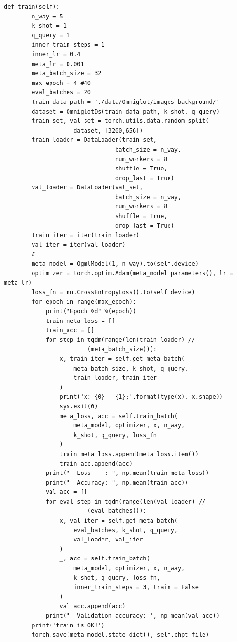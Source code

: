 \begin{lstlisting}
def train(self):
        n_way = 5
        k_shot = 1
        q_query = 1
        inner_train_steps = 1
        inner_lr = 0.4
        meta_lr = 0.001
        meta_batch_size = 32
        max_epoch = 4 #40
        eval_batches = 20
        train_data_path = './data/Omniglot/images_background/'
        dataset = OmniglotDs(train_data_path, k_shot, q_query)
        train_set, val_set = torch.utils.data.random_split(
                    dataset, [3200,656])
        train_loader = DataLoader(train_set,
                                batch_size = n_way,
                                num_workers = 8,
                                shuffle = True,
                                drop_last = True)
        val_loader = DataLoader(val_set,
                                batch_size = n_way,
                                num_workers = 8,
                                shuffle = True,
                                drop_last = True)
        train_iter = iter(train_loader)
        val_iter = iter(val_loader)
        #
        meta_model = OgmlModel(1, n_way).to(self.device)
        optimizer = torch.optim.Adam(meta_model.parameters(), lr = meta_lr)
        loss_fn = nn.CrossEntropyLoss().to(self.device)
        for epoch in range(max_epoch):
            print("Epoch %d" %(epoch))
            train_meta_loss = []
            train_acc = []
            for step in tqdm(range(len(train_loader) // 
                        (meta_batch_size))): 
                x, train_iter = self.get_meta_batch(
                    meta_batch_size, k_shot, q_query, 
                    train_loader, train_iter
                )
                print('x: {0} - {1};'.format(type(x), x.shape))
                sys.exit(0)
                meta_loss, acc = self.train_batch(
                    meta_model, optimizer, x, n_way, 
                    k_shot, q_query, loss_fn
                )
                train_meta_loss.append(meta_loss.item())
                train_acc.append(acc)
            print("  Loss    : ", np.mean(train_meta_loss))
            print("  Accuracy: ", np.mean(train_acc))
            val_acc = []
            for eval_step in tqdm(range(len(val_loader) // 
                        (eval_batches))):
                x, val_iter = self.get_meta_batch(
                    eval_batches, k_shot, q_query, 
                    val_loader, val_iter
                )
                _, acc = self.train_batch(
                    meta_model, optimizer, x, n_way, 
                    k_shot, q_query, loss_fn, 
                    inner_train_steps = 3, train = False
                )
                val_acc.append(acc)
            print("  Validation accuracy: ", np.mean(val_acc))
        print('train is OK!')
        torch.save(meta_model.state_dict(), self.chpt_file)
\end{lstlisting}
